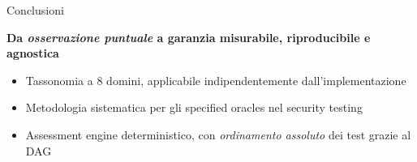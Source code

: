 
\begin{frame}{Conclusioni}
  \begin{center}
    \textbf{Da \textit{osservazione puntuale} a \alert{garanzia} \alert{misurabile}, \alert{riproducibile} e \alert{agnostica}}
  \end{center}
  \vspace{0.6em}
  \begin{itemize}
    \item Tassonomia a \alert{8 domini}, applicabile indipendentemente dall'implementazione

    \item Metodologia sistematica per gli \alert{specified oracles} nel security testing

    \item Assessment engine \alert{deterministico}, con \textit{ordinamento assoluto} dei test grazie al \alert{DAG}
  \end{itemize}
\end{frame}